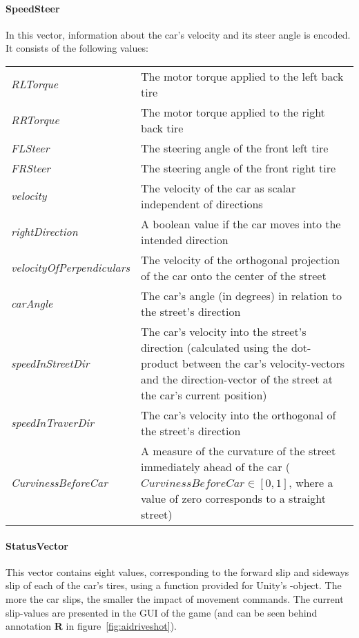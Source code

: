 \paragraph{SpeedSteer} In this vector, information about the car's velocity and its steer angle is encoded. It consists of the following values:

\renewcommand{\arraystretch}{1.3}
\begin{flushleft}
	\begin{tabular}{>{\em}p{2.9cm} p{\textwidth-3.8cm}} 
		RLTorque & The motor torque applied to the left back tire\\
		RRTorque & The motor torque applied to the right back tire\\
		FLSteer & The steering angle of the front left tire\\
		FRSteer & The steering angle of the front right tire\\
		velocity & The velocity of the car as scalar independent of directions\\
		rightDirection & A boolean value if the car moves into the intended direction\\
		velocityOfPerpendiculars & \hspace*{0.8cm} The velocity of the orthogonal projection of the car onto the center of the street\\ %
		carAngle & The car's angle (in degrees) in relation to the street's direction\\
		speedInStreetDir & The car's velocity into the street's direction (calculated using the dot-product between the car's velocity-vectors and the direction-vector of the street at the car's current position)\\
		speedInTraverDir &  The car's velocity into the orthogonal of the street's direction\\
		CurvinessBeforeCar & A measure of the curvature of the street immediately ahead of the car ($CurvinessBeforeCar \in [0,1]$, where a value of zero corresponds to a straight street)\\	
	\end{tabular}
\end{flushleft}

\paragraph{StatusVector} This vector contains eight values, corresponding to the forward slip and sideways slip of each of the car's tires, using a function provided for Unity's -object. The more the car slips, the smaller the impact of movement commands. The current slip-values are presented in the GUI of the game (and can be seen behind annotation \textbf{R} in figure~\ref{fig:aidriveshot}).

